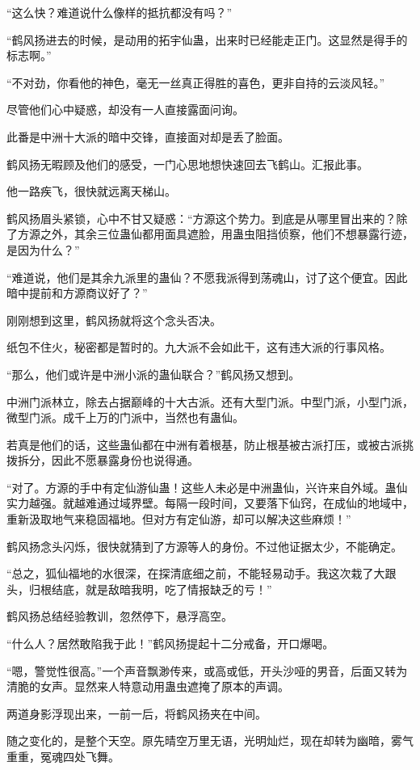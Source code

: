 \begin{this_body}
“这么快？难道说什么像样的抵抗都没有吗？”

“鹤风扬进去的时候，是动用的拓宇仙蛊，出来时已经能走正门。这显然是得手的标志啊。”

“不对劲，你看他的神色，毫无一丝真正得胜的喜色，更非自持的云淡风轻。”

尽管他们心中疑惑，却没有一人直接露面问询。

此番是中洲十大派的暗中交锋，直接面对却是丢了脸面。

鹤风扬无暇顾及他们的感受，一门心思地想快速回去飞鹤山。汇报此事。

他一路疾飞，很快就远离天梯山。

鹤风扬眉头紧锁，心中不甘又疑惑：“方源这个势力。到底是从哪里冒出来的？除了方源之外，其余三位蛊仙都用面具遮脸，用蛊虫阻挡侦察，他们不想暴露行迹，是因为什么？”

“难道说，他们是其余九派里的蛊仙？不愿我派得到荡魂山，讨了这个便宜。因此暗中提前和方源商议好了？”

刚刚想到这里，鹤风扬就将这个念头否决。

纸包不住火，秘密都是暂时的。九大派不会如此干，这有违大派的行事风格。

“那么，他们或许是中洲小派的蛊仙联合？”鹤风扬又想到。

中洲门派林立，除去占据巅峰的十大古派。还有大型门派。中型门派，小型门派，微型门派。成千上万的门派中，当然也有蛊仙。

若真是他们的话，这些蛊仙都在中洲有着根基，防止根基被古派打压，或被古派挑拨拆分，因此不愿暴露身份也说得通。

“对了。方源的手中有定仙游仙蛊！这些人未必是中洲蛊仙，兴许来自外域。蛊仙实力越强。就越难通过域界壁。每隔一段时间，又要落下仙窍，在成仙的地域中，重新汲取地气来稳固福地。但对方有定仙游，却可以解决这些麻烦！”

鹤风扬念头闪烁，很快就猜到了方源等人的身份。不过他证据太少，不能确定。

“总之，狐仙福地的水很深，在探清底细之前，不能轻易动手。我这次栽了大跟头，归根结底，就是敌暗我明，吃了情报缺乏的亏！”

鹤风扬总结经验教训，忽然停下，悬浮高空。

“什么人？居然敢陷我于此！”鹤风扬提起十二分戒备，开口爆喝。

“嗯，警觉性很高。”一个声音飘渺传来，或高或低，开头沙哑的男音，后面又转为清脆的女声。显然来人特意动用蛊虫遮掩了原本的声调。

两道身影浮现出来，一前一后，将鹤风扬夹在中间。

随之变化的，是整个天空。原先晴空万里无语，光明灿烂，现在却转为幽暗，雾气重重，冤魂四处飞舞。


\end{this_body}
